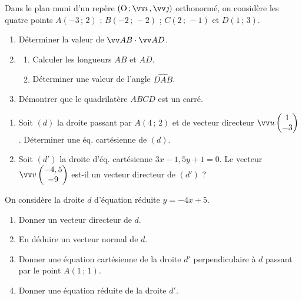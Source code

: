 \documentclass[a4paper,11pt]{article}
\begin{document}
\begin{cexercice}
Dans le plan muni d’un repère $\Rij$ orthonormé, on considère les quatre points $A(-3\,;\,2)$ ; $B(-2\,;\,-2)$ ; $C(2\,;\,-1)$ et $D(1\,;\,3)$.
%
\begin{enumerate}[]
	\item Déterminer la valeur de $\vect{AB}\cdot\vect{AD}$.
	\item 
	\begin{enumerate}
		\item Calculer les longueurs $AB$ et $AD$.
		\item Déterminer une valeur de l'angle $\widehat{DAB}$.
	\end{enumerate}
	\item Démontrer que le quadrilatère $ABCD$ est un carré.
\end{enumerate}
\end{cexercice}

\begin{cexercice}
\vspace{-0.8\baselineskip}
\begin{enumerate}[leftmargin=*]
	\item Soit $(d)$ la droite passant par $A(4\,;\,2)$ et de vecteur directeur $\vect{u}\coordeux{1}{-3}$. Déterminer une éq. cartésienne de $(d)$.
	\item Soit $(d')$ la droite d’éq. cartésienne $3x - 1,5y + 1 = 0$. Le vecteur $\vect{v} \coordeux{-4,5}{-9}$ est-il un vecteur directeur de $(d')$ ?
\end{enumerate}
\end{cexercice}

\begin{cexercice}
On considère la droite $d$ d’équation réduite $y = -4x + 5$.
%
\begin{enumerate}
	\item Donner un vecteur directeur de $d$.
	\item En déduire un vecteur normal de $d$.
	\item Donner une équation cartésienne de la droite $d'$ perpendiculaire à $d$ passant par le point $A(1\,;\,1)$.
	\item Donner une équation réduite de la droite $d'$.
\end{enumerate}
\end{cexercice}
\end{document}
